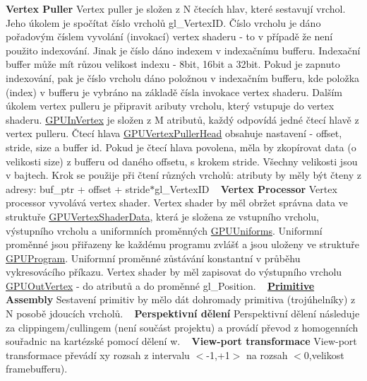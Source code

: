 {\bfseries Vertex Puller} Vertex puller je složen z N čtecích hlav, které sestavují vrchol. Jeho úkolem je spočítat číslo vrcholů gl\+\_\+\+Vertex\+ID. Číslo vrcholu je dáno pořadovým číslem vyvolání (invokací) vertex shaderu -\/ to v případě že není použito indexování. Jinak je číslo dáno indexem v indexačnímu bufferu. Indexační buffer může mít růzou velikost indexu -\/ 8bit, 16bit a 32bit. Pokud je zapnuto indexování, pak je číslo vrcholu dáno položnou v indexačním bufferu, kde položka (index) v bufferu je vybráno na základě čísla invokace vertex shaderu. Dalším úkolem vertex pulleru je připravit aributy vrcholu, který vstupuje do vertex shaderu. \hyperlink{structGPUInVertex}{G\+P\+U\+In\+Vertex} je složen z M atributů, každý odpovídá jedné čtecí hlavě z vertex pulleru. Čtecí hlava \hyperlink{structGPUVertexPullerHead}{G\+P\+U\+Vertex\+Puller\+Head} obsahuje nastavení -\/ offset, stride, size a buffer id. Pokud je čtecí hlava povolena, měla by zkopírovat data (o velikosti size) z bufferu od daného offsetu, s krokem stride. Všechny velikosti jsou v bajtech. Krok se použije při čtení různých vrcholů\+: atributy by měly být čteny z adresy\+: buf\+\_\+ptr + offset + stride$\ast$gl\+\_\+\+Vertex\+ID ~\newline
 {\bfseries Vertex Processor} Vertex processor vyvolává vertex shader. Vertex shader by měl obržet správna data ve struktuře \hyperlink{structGPUVertexShaderData}{G\+P\+U\+Vertex\+Shader\+Data}, která je složena ze vstupního vrcholu, výstupního vrcholu a uniformních proměnných \hyperlink{structGPUUniforms}{G\+P\+U\+Uniforms}. Uniformní proměnné jsou přiřazeny ke každému programu zvlášť a jsou uloženy ve struktuře \hyperlink{structGPUProgram}{G\+P\+U\+Program}. Uniformní proměnné zůstávání konstantní v průběhu vykresovácího příkazu. Vertex shader by měl zapisovat do výstupního vrcholu \hyperlink{structGPUOutVertex}{G\+P\+U\+Out\+Vertex} -\/ do atributů a do proměnné gl\+\_\+\+Position. ~\newline
 {\bfseries \hyperlink{structPrimitive}{Primitive} Assembly} Sestavení primitiv by mělo dát dohromady primitiva (trojúhelníky) z N posobě jdoucích vrcholů. ~\newline
 {\bfseries Perspektivní dělení} Perspektivní dělení následuje za clippingem/cullingem (není součást projektu) a provádí převod z homogenních souřadnic na kartézské pomocí dělení w. ~\newline
 {\bfseries View-\/port transformace} View-\/port transformace převádí xy rozsah z intervalu $<$-\/1,+1$>$ na rozsah $<$0,velikost framebufferu). ~\newline
